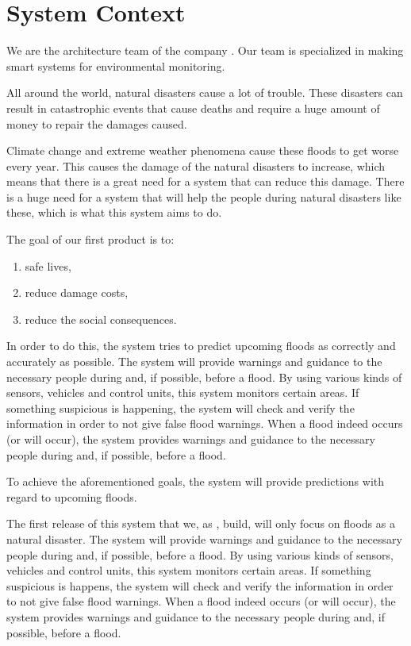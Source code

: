 \chapter{System Context}
\label{ch:context}

We are the architecture team of the company \CompanyName. Our team is specialized in making smart systems for environmental monitoring.

All around the world, natural disasters cause a lot of trouble. These disasters can result in catastrophic events that cause deaths and require a huge amount of money to repair the damages caused.

Climate change and extreme weather phenomena cause these floods to get worse every year. This causes the damage of the natural disasters to increase, which means that there is a great need for a system that can reduce this damage. There is a huge need for a system that will help the people during natural disasters like these, which is what this system aims to do.


The goal of our first product is to:
\begin{enumerate}
  \item safe lives,
  \item reduce damage costs,
  \item reduce the social consequences.
\end{enumerate}

In order to do this, the system tries to predict upcoming floods as correctly and accurately as possible. The system will provide warnings and guidance to the necessary people during and, if possible, before a flood. By using various kinds of sensors, vehicles and control units, this system monitors certain areas. If something suspicious is happening, the system will check and verify the information in order to not give false flood warnings. When a flood indeed occurs (or will occur), the system   provides warnings and guidance to the necessary people during and, if possible, before a flood. 

To achieve the aforementioned goals, the system will provide predictions with regard to upcoming floods.

The first release of this system that we, as \CompanyName, build, will only focus on floods as a natural disaster. The system will provide warnings and guidance to the necessary people during and, if possible, before a flood. By using various kinds of sensors, vehicles and control units, this system monitors certain areas. If something suspicious is happens, the system will check and verify the information in order to not give false flood warnings. When a flood indeed occurs (or will occur), the system   provides warnings and guidance to the necessary people during and, if possible, before a flood. 

